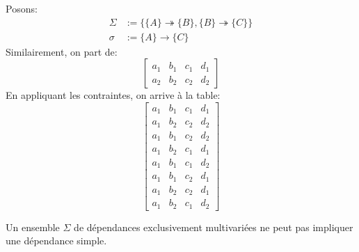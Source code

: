 \documentclass[french, toc]{../cs-classes/cs-classes}
\begin{document}
\begin{exemple}
    Posons:
    \begin{equation*}
        \begin{aligned}
            \Sigma &:= \{\{A\}\twoheadrightarrow\{B\}, \{B\}\twoheadrightarrow\{C\}\}\\
            \sigma &:= \{A\} \rightarrow \{C\}
        \end{aligned}
    \end{equation*}
    Similairement, on part de:
    \begin{equation*}
        \begin{bmatrix}
            a_1&b_1&c_1&d_1\\
            a_2&b_2&c_2&d_2
        \end{bmatrix}
    \end{equation*}
    En appliquant les contraintes, on arrive à la table:
    \begin{equation*}
        \begin{bmatrix}
            a_1&b_1&c_1&d_1\\
            a_1&b_2&c_2&d_2\\
            a_1&b_1&c_2&d_2\\
            a_1&b_2&c_1&d_1\\
            a_1&b_1&c_1&d_2\\
            a_1&b_1&c_2&d_1\\
            a_1&b_2&c_2&d_1\\
            a_1&b_2&c_1&d_2
        \end{bmatrix}
    \end{equation*}
\end{exemple}

\begin{remarque}
    Un ensemble $\Sigma$ de dépendances exclusivement multivariées ne peut pas impliquer une dépendance simple.
\end{remarque}
\end{document}
